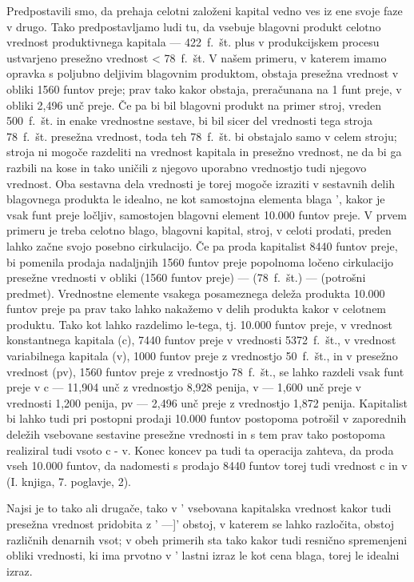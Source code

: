 \documentclass[kapital_02.tex]{subfiles}
\begin{document}
Predpostavili smo, da prehaja celotni založeni kapital vedno ves iz ene svoje faze v drugo. Tako predpostavljamo ludi tu, da vsebuje blagovni produkt \KPEP celotno vrednost produktivnega kapitala \KPEP — 422~f.~št. plus v produkcijskem procesu ustvarjeno presežno vrednost < 78~f.~št. V našem primeru, v katerem imamo opravka s poljubno deljivim blagovnim produktom, obstaja presežna vrednost v obliki 1560 funtov preje; prav tako kakor obstaja, preračunana na 1 funt preje, v obliki 2,496 unč preje. Če pa bi bil blagovni produkt na primer stroj, vreden 500~f.~št. in enake vrednostne sestave, bi bil sicer del vrednosti tega stroja 78~f.~št. presežna vrednost, toda teh 78~f.~št. bi obstajalo samo v celem stroju; stroja ni mogoče razdeliti na vrednost kapitala in presežno vrednost, ne da bi ga razbili na kose in tako uničili z njegovo uporabno vrednostjo tudi njegovo vrednost. Oba sestavna dela vrednosti je torej mogoče izraziti v sestavnih delih blagovnega produkta le idealno, ne kot samostojna elementa blaga \KPEB', kakor je vsak funt preje ločljiv, samostojen blagovni element 10.000 funtov preje. V prvem primeru je treba celotno blago, blagovni kapital, stroj, v celoti prodati, preden lahko začne \KPEd svojo posebno cirkulacijo. Če pa proda kapitalist 8440 funtov preje, bi pomenila prodaja nadaljnjih 1560 funtov preje popolnoma ločeno cirkulacijo presežne vrednosti v obliki \KPEb (1560 funtov preje) — \KPEd (78~f.~št.) — \KPEb (potrošni predmet). Vrednostne elemente vsakega posameznega deleža produkta 10.000 funtov preje pa prav tako lahko nakažemo v delih produkta kakor v celotnem produktu. Tako kot lahko razdelimo le-tega, tj. 10.000 funtov preje, v vrednost konstantnega kapitala (c), 7440 funtov preje v vrednosti 5372~f.~št., v vrednost variabilnega kapitala (v), 1000 funtov preje z vrednostjo 50~f.~št., in v presežno vrednost (pv), 1560 funtov preje z vrednostjo 78~f.~št., se lahko razdeli vsak funt preje v c — 11,904 unč z vrednostjo 8,928 penija, v — 1,600 unč preje v vrednosti 1,200 penija, pv — 2,496 unč preje z vrednostjo 1,872 penija. Kapitalist bi lahko tudi pri postopni prodaji 10.000 funtov postopoma potrošil v zaporednih deležih vsebovane sestavine presežne vrednosti in s tem prav tako postopoma realiziral tudi vsoto c - v. Konec koncev pa tudi ta operacija zahteva, da proda vseh 10.000 funtov, da nadomesti s prodajo 8440 funtov torej tudi vrednost c in v (I. knjiga, 7. poglavje, 2).

Najsi je to tako ali drugače, tako v \KPEB' vsebovana kapitalska vrednost kakor tudi presežna vrednost pridobita z \KPEB' —]' obstoj, v katerem se lahko razločita, obstoj različnih denarnih vsot; v obeh primerih sta tako \KPED kakor tudi \KPEd resnično spremenjeni obliki vrednosti, ki ima prvotno v \KPEB' lastni izraz le kot cena blaga, torej le idealni izraz.
\end{document}
